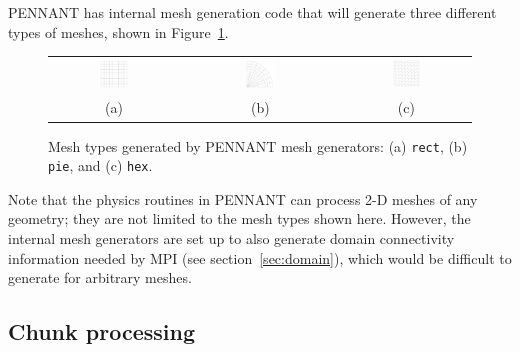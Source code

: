 \documentclass[11pt,letterpaper]{article}
\begin{document}
PENNANT has internal mesh generation code that will generate three
different types of meshes, shown in Figure~\ref{fig:meshtype}.
\begin{figure}
    \centering
    \begin{tabular}{ccccc}
    \includegraphics[width=0.25\textwidth]{rect-meshtype.png} &
    \hspace{0.025\textwidth} &
    \includegraphics[width=0.25\textwidth]{pie-meshtype.png} &
    \hspace{0.025\textwidth} &
    \includegraphics[width=0.25\textwidth]{hex-meshtype.png} \\
    (a) && (b) && (c) \\
    \end{tabular}
    \caption{Mesh types generated by PENNANT mesh generators:
    (a) {\tt rect}, (b) {\tt pie}, and (c) {\tt hex}.}
    \label{fig:meshtype}
\end{figure}

Note that the physics routines in PENNANT can process 2-D meshes of
any geometry; they are not limited to the mesh types shown here.
However, the internal mesh generators are set up to also generate domain
connectivity information needed by MPI (see section~\ref{sec:domain}),
which would be difficult to generate for arbitrary meshes.

\subsection{Chunk processing}
\label{sec:chunk}
\end{document}

